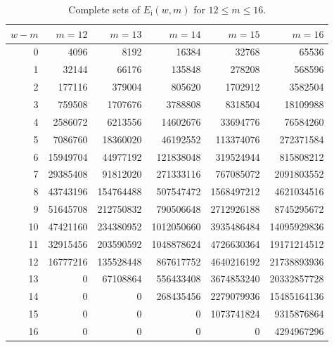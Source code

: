 \documentclass[journal, twocol]{IEEEtran}
\newcommand{\Ei}{{E_{\text{i}}}}
\begin{document}
\begin{table}
\centering
\footnotesize
\begin{tabular}{|@{\hskip.08cm}r@{\hskip.08cm}||@{\hskip.08cm}r@{\hskip.08cm}|@{\hskip.08cm}r@{\hskip.08cm}|@{\hskip.08cm}r@{\hskip.08cm}|@{\hskip.08cm}r@{\hskip.08cm}|@{\hskip.08cm}r@{\hskip.08cm}|}
\hline
$w-m$ & $m=12$   & $m=13$    & $m=14$     & $m=15$     & $m=16$      \\\hline\hline
0     & 4096     & 8192      & 16384      & 32768      & 65536       \\\hline
1     & 32144    & 66176     & 135848     & 278208     & 568596      \\\hline
2     & 177116   & 379004    & 805620     & 1702912    & 3582504     \\\hline
3     & 759508   & 1707676   & 3788808    & 8318504    & 18109988    \\\hline
4     & 2586072  & 6213556   & 14602676   & 33694776   & 76584260    \\\hline
5     & 7086760  & 18360020  & 46192552   & 113374076  & 272371584   \\\hline
6     & 15949704 & 44977192  & 121838048  & 319524944  & 815808212   \\\hline
7     & 29385408 & 91812020  & 271333116  & 767085072  & 2091803552  \\\hline
8     & 43743196 & 154764488 & 507547472  & 1568497212 & 4621034516  \\\hline
9     & 51645708 & 212750832 & 790506648  & 2712926188 & 8745295672  \\\hline
10    & 47421160 & 234380952 & 1012050660 & 3935486484 & 14095929836 \\\hline
11    & 32915456 & 203590592 & 1048878624 & 4726630364 & 19171214512 \\\hline
12    & 16777216 & 135528448 & 867617752  & 4640216192 & 21738893936 \\\hline
13    & 0        & 67108864  & 556433408  & 3674853240 & 20332857728 \\\hline
14    & 0        & 0         & 268435456  & 2279079936 & 15485164136 \\\hline
15    & 0        & 0         & 0          & 1073741824 & 9315876864  \\\hline
16    & 0        & 0         & 0          & 0          & 4294967296  \\\hline
\end{tabular}
\caption{Complete sets of $\Ei(w,m)$ for $12 \leq m \leq 16$.}
\label{t:e1wmc}
\end{table}
\end{document}
